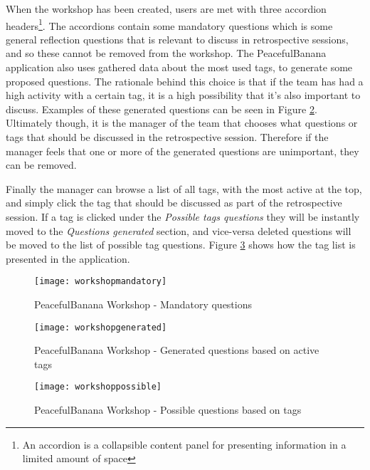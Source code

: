 When the workshop has been created, users are met with three accordion headers\footnote{An accordion is a collapsible content panel for presenting information in a limited amount of space}. The accordions contain some mandatory questions which is some general reflection questions that is relevant to discuss in retrospective sessions, and so these cannot be removed from the workshop. The PeacefulBanana application also uses gathered data about the most used tags, to generate some proposed questions. The rationale behind this choice is that if the team has had a high activity with a certain tag, it is a high possibility that it's also important to discuss. Examples of these generated questions can be seen in Figure \ref{workshopgeneratedfunc}. Ultimately though, it is the manager of the team that chooses what questions or tags that should be discussed in the retrospective session. Therefore if the manager feels that one or more of the generated questions are unimportant, they can be removed. 

Finally the manager can browse a list of all tags, with the most active at the top, and simply click the tag that should be discussed as part of the retrospective session. If a tag is clicked under the \emph{Possible tags questions} they will be instantly moved to the \emph{Questions generated} section, and vice-versa deleted questions will be moved to the list of possible tag questions. Figure \ref{workshoppossiblefunc} shows how the tag list is presented in the application. 

\begin{figure}[H]
    \centering
        \texttt{[image: workshopmandatory]}
    \caption{PeacefulBanana Workshop - Mandatory questions}
    \label{workshopmandatoryfunc}
\end{figure}
\begin{figure}[H]
    \centering
        \texttt{[image: workshopgenerated]}
    \caption{PeacefulBanana Workshop - Generated questions based on active tags}
    \label{workshopgeneratedfunc}
\end{figure}
\begin{figure}[H]
    \centering
        \texttt{[image: workshoppossible]}
    \caption{PeacefulBanana Workshop - Possible questions based on tags}
    \label{workshoppossiblefunc}
\end{figure}

